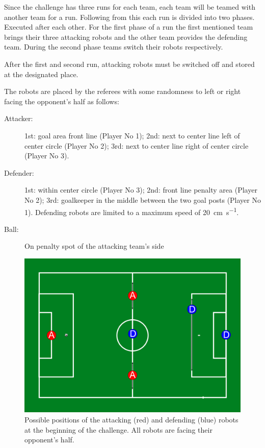         Since the challenge has three runs for each team, each team will be teamed with another team for a run. Following from this each run is divided into two phases. Executed after each other. For the first phase of a run the first mentioned team brings their three attacking robots and the other team provides the defending team. During the second phase teams switch their robots respectively.

        After the first and second run, attacking robots must be switched off and stored at the designated place.

        The robots are placed by the referees with some randomness to left or right facing the opponent's half as follows:

        \begin{description}
            \item[Attacker:] 1st: goal area front line (Player No 1); 2nd: next to center line left of center circle (Player No 2); 3rd: next to center line right of center circle (Player No 3).
            \item[Defender:] 1st: within center circle (Player No 3); 2nd: front line penalty area (Player No 2); 3rd: goalkeeper in the middle between the two goal posts (Player No 1). Defending robots are limited to a maximum speed of \qty{20}{\cm \per \second}.
            \item[Ball:] On penalty spot of the attacking team's side
        \end{description}

        \begin{figure}[hb!]
            \begin{center}
                \leavevmode
                \includegraphics[width=1\columnwidth]{figs/dbhc_initial.png}
                \caption{Possible positions of the {\color{red}attacking (red)} and {\color{blue}defending (blue)} robots at the beginning of the challenge. All robots are facing their opponent's half.}
                \label{fig:ball_handling_inital_positions}
            \end{center}
        \end{figure}

